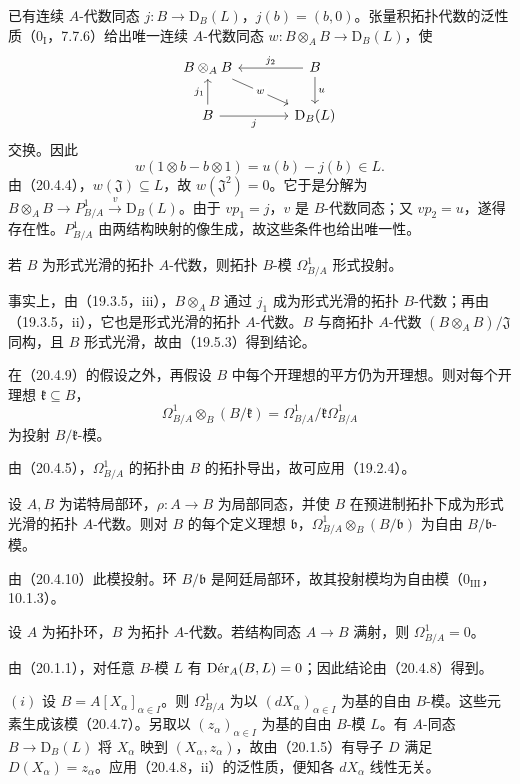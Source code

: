 已有连续 $A$-代数同态 $j:B\to\mathrm D_B(L)$，$j(b)=(b,0)$。张量积拓扑代数的泛性质（$0_{\mathrm I}$，7.7.6）给出唯一连续 $A$-代数同态 $w:B\otimes_A B\to\mathrm D_B(L)$，使
\[
\begin{tikzcd}[column sep=large]
 B\otimes_A B &B\arrow[l,"j_2"']\arrow[d,"u"]\\
 B\arrow[u,"j_1"]\arrow[r,"j"']&\mathrm D_B(L)
 \arrow[from=1-1,to=2-2,"w" description]
\end{tikzcd}
\]
交换。因此
\[
 w(1\otimes b-b\otimes1)=u(b)-j(b)\in L.
\]
由（20.4.4），$w(\mathfrak J)\subseteq L$，故 $w(\mathfrak J^2)=0$。它于是分解为 $B\otimes_A B\to P^1_{B/A}\xrightarrow{v}\mathrm D_B(L)$。由于 $vp_1=j$，$v$ 是 $B$-代数同态；又 $vp_2=u$，遂得存在性。$P^1_{B/A}$ 由两结构映射的像生成，故这些条件也给出唯一性。

若 $B$ 为形式光滑的拓扑 $A$-代数，则拓扑 $B$-模 $\Omega^1_{B/A}$ 形式投射。

事实上，由（19.3.5，iii），$B\otimes_A B$ 通过 $j_1$ 成为形式光滑的拓扑 $B$-代数；再由（19.3.5，ii），它也是形式光滑的拓扑 $A$-代数。$B$ 与商拓扑 $A$-代数 $(B\otimes_A B)/\mathfrak J$ 同构，且 $B$ 形式光滑，故由（19.5.3）得到结论。

在（20.4.9）的假设之外，再假设 $B$ 中每个开理想的平方仍为开理想。则对每个开理想 $\mathfrak k\subseteq B$，
\[
 \Omega^1_{B/A}\otimes_B(B/\mathfrak k)
 =\Omega^1_{B/A}/\mathfrak k\Omega^1_{B/A}
\]
为投射 $B/\mathfrak k$-模。

由（20.4.5），$\Omega^1_{B/A}$ 的拓扑由 $B$ 的拓扑导出，故可应用（19.2.4）。

设 $A,B$ 为诺特局部环，$\rho:A\to B$ 为局部同态，并使 $B$ 在预进制拓扑下成为形式光滑的拓扑 $A$-代数。则对 $B$ 的每个定义理想 $\mathfrak b$，$\Omega^1_{B/A}\otimes_B(B/\mathfrak b)$ 为自由 $B/\mathfrak b$-模。

由（20.4.10）此模投射。环 $B/\mathfrak b$ 是阿廷局部环，故其投射模均为自由模（$0_{\mathrm{III}}$，10.1.3）。

设 $A$ 为拓扑环，$B$ 为拓扑 $A$-代数。若结构同态 $A\to B$ 满射，则 $\Omega^1_{B/A}=0$。

由（20.1.1），对任意 $B$-模 $L$ 有 $\Der_A(B,L)=0$；因此结论由（20.4.8）得到。

$(i)$ 设 $B=A[X_\alpha]_{\alpha\in I}$。则 $\Omega^1_{B/A}$ 为以 $(dX_\alpha)_{\alpha\in I}$ 为基的自由 $B$-模。这些元素生成该模（20.4.7）。另取以 $(z_\alpha)_{\alpha\in I}$ 为基的自由 $B$-模 $L$。有 $A$-同态 $B\to\mathrm D_B(L)$ 将 $X_\alpha$ 映到 $(X_\alpha,z_\alpha)$，故由（20.1.5）有导子 $D$ 满足 $D(X_\alpha)=z_\alpha$。应用（20.4.8，ii）的泛性质，便知各 $dX_\alpha$ 线性无关。

